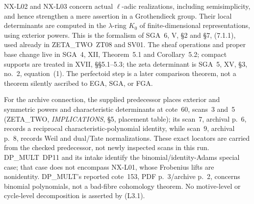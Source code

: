 NX-L02 and NX-L03 concern actual $\ell$-adic realizations, including
semisimplicity, and hence strengthen a mere assertion in a
Grothendieck group.  Their local determinants are computed in the
$\lambda$-ring $K_0$ of finite-dimensional representations, using
exterior powers.  This is the formalism of SGA~6, V, \S2 and
\S7, (7.1.1), used already in ZETA\_TWO~ZT08 and SV01.  The sheaf
operations and proper base change live in SGA~4, XII, Theorem~5.1
and Corollary~5.2; compact supports are treated in XVII, \S\S5.1--5.3;
the zeta determinant is SGA~5, XV, \S3, no.~2, equation~(1).
The perfectoid step is a later comparison theorem, not a theorem
silently ascribed to EGA, SGA, or FGA.

For the archive connection, the supplied predecessor places exterior
and symmetric powers and characteristic determinants at cote~60,
scans~3 and~5 (ZETA\_TWO, \emph{IMPLICATIONS}, \S5, placement table);
its scan~7, archival p.~6, records a reciprocal characteristic-polynomial
identity, while scan~9, archival p.~8, records Weil and dual/Tate
normalizations.  These exact locators are carried from the checked
predecessor, not newly inspected scans in this run.  DP\_MULT~DP11
and its intake identify the binomial/identity-Adams special case;
that case does not encompass NX-L01, whose Frobenius lifts are
nonidentity.  DP\_MULT's reported cote~153, PDF p.~3/archive p.~2,
concerns binomial polynomials, not a bad-fibre cohomology theorem.
No motive-level or cycle-level decomposition is asserted by (L3.1).
